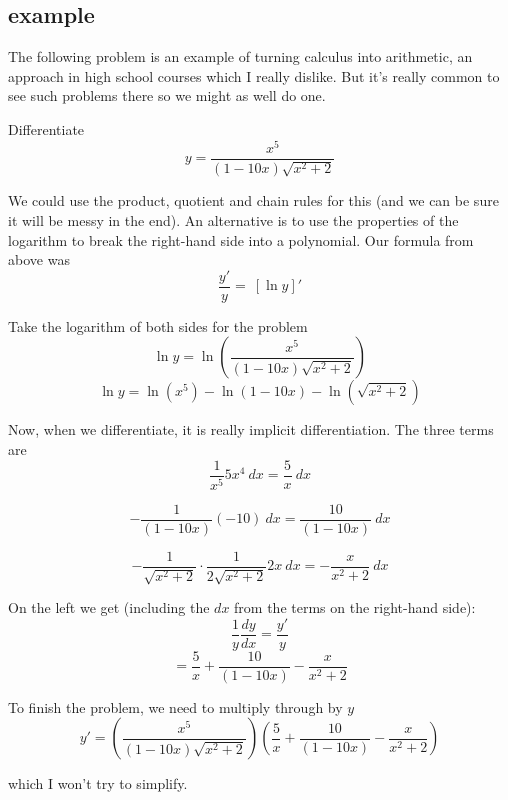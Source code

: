 \documentclass[11pt, oneside]{article}
\begin{document}
\subsection*{example}

The following problem is an example of turning calculus into arithmetic, an approach in high school courses which I really dislike.  But it's really common to see such problems there so we might as well do one.

Differentiate
\[ y = \frac{x^5}{(1-10x)\sqrt{x^2+2}} \]

We could use the product, quotient and chain rules for this (and we can be sure it will be messy in the end).  An alternative is to use the properties of the logarithm to break the right-hand side into a polynomial.  Our formula from above was
\[ \frac{y'}{y} =  \ [ \ln y ]' \]

Take the logarithm of both sides for the problem
\[ \ln y = \ln (\frac{x^5}{(1-10x)\sqrt{x^2+2}} ) \]
\[   \ln y = \ln(x^5) - \ln(1-10x) - \ln(\sqrt{x^2+2}) \]

Now, when we differentiate, it is really implicit differentiation.  The three terms are
\[  \frac{1}{x^5} 5x^4 \ dx  = \frac{5}{x} \ dx \]

\[ -\frac{1}{(1-10x)} (-10) \ dx = \frac{10}{(1-10x)} \ dx \]

\[  - \frac{1}{\sqrt{x^2+2}} \cdot \frac{1}{2\sqrt{x^2+2}} 2x \ dx = - \frac{x}{x^2 + 2}  \ dx \]

On the left we get (including the $dx$ from the terms on the right-hand side):
\[  \frac{1}{y} \frac{dy}{dx} = \frac{y'}{y} \]
\[  =   \frac{5}{x} + \frac{10}{(1-10x)} - \frac{x}{x^2 + 2} \]

To finish the problem, we need to multiply through by $y$
\[  y' = (\frac{x^5}{(1-10x)\sqrt{x^2+2}}) ( \frac{5}{x} + \frac{10}{(1-10x)} - \frac{x}{x^2 + 2}) \]

which I won't try to simplify.
\end{document}
